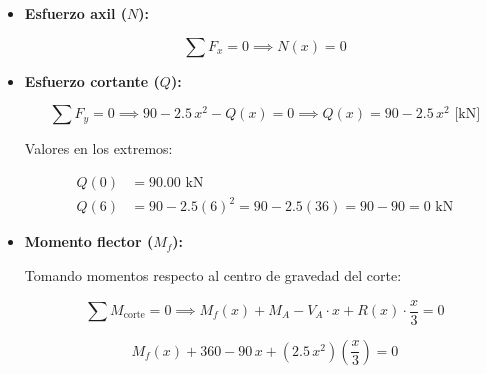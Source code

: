 \begin{itemize}

    \item \textbf{Esfuerzo axil ($N$):}

          \begin{equation}

              \sum F_x = 0 \implies \boxed{N(x) = 0}

          \end{equation}



    \item \textbf{Esfuerzo cortante ($Q$):}

          \begin{equation}

              \sum F_y = 0 \implies 90 - 2.5\,x^2 - Q(x) = 0 \implies \boxed{Q(x) = 90 - 2.5\,x^2\text{ [kN]}}

          \end{equation}

          Valores en los extremos:

          \begin{align*}

              Q(0) & = 90.00\text{ kN}                                      \\

              Q(6) & = 90 - 2.5(6)^2 = 90 - 2.5(36) = 90 - 90 = 0\text{ kN}

          \end{align*}



    \item \textbf{Momento flector ($M_f$):}

          Tomando momentos respecto al centro de gravedad del corte:

          \begin{equation}

              \sum M_{\text{corte}} = 0 \implies M_f(x) + M_A - V_A \cdot x + R(x) \cdot \frac{x}{3} = 0

          \end{equation}

          \begin{equation}

              M_f(x) + 360 - 90\,x + (2.5\,x^2)\left(\frac{x}{3}\right) = 0

          \end{equation}

          \begin{equation}


\end{equation}
\end{itemize}
